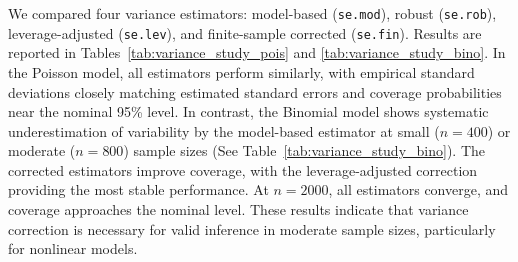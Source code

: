 We compared four variance estimators: model-based (\texttt{se.mod}), robust (\texttt{se.rob}), leverage-adjusted (\texttt{se.lev}), and finite-sample corrected (\texttt{se.fin}). Results are reported in Tables~\ref{tab:variance_study_pois} and \ref{tab:variance_study_bino}. In the Poisson model, all estimators perform similarly, with empirical standard deviations closely matching estimated standard errors and coverage probabilities near the nominal 95\% level. In contrast, the Binomial model shows systematic underestimation of variability by the model-based estimator at small ($n=400$) or moderate ($n=800$) sample sizes (See Table~\ref{tab:variance_study_bino}). 
The corrected estimators improve coverage, with the leverage-adjusted correction providing the most stable performance. At $n=2000$, all estimators converge, and coverage approaches the nominal level. These results indicate that variance correction is necessary for valid inference in moderate sample sizes, particularly for nonlinear models.

